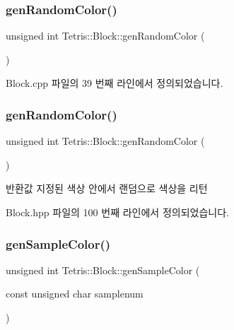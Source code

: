 \subsubsection{\texorpdfstring{gen\+Random\+Color()}{genRandomColor()}\hspace{0.1cm}{\footnotesize\ttfamily [1/2]}}
{\footnotesize\ttfamily unsigned int Tetris\+::\+Block\+::gen\+Random\+Color (\begin{DoxyParamCaption}{ }\end{DoxyParamCaption})}



Block.\+cpp 파일의 39 번째 라인에서 정의되었습니다.

\mbox{\label{class_tetris_1_1_block_a4bae85cab786853cb3ff76aa7fe72edc}} 
\subsubsection{\texorpdfstring{gen\+Random\+Color()}{genRandomColor()}\hspace{0.1cm}{\footnotesize\ttfamily [2/2]}}
{\footnotesize\ttfamily unsigned int Tetris\+::\+Block\+::gen\+Random\+Color (\begin{DoxyParamCaption}{ }\end{DoxyParamCaption})\hspace{0.3cm}{\ttfamily [inline]}}

\begin{DoxyReturn}{반환값}
지정된 색상 안에서 랜덤으로 색상을 리턴 
\end{DoxyReturn}


Block.\+hpp 파일의 100 번째 라인에서 정의되었습니다.

\mbox{\label{class_tetris_1_1_block_a9cac65704d2c788488ecf65d5b0467bd}} 
\subsubsection{\texorpdfstring{gen\+Sample\+Color()}{genSampleColor()}}
{\footnotesize\ttfamily unsigned int Tetris\+::\+Block\+::gen\+Sample\+Color (\begin{DoxyParamCaption}\item[{const unsigned char}]{samplenum }\end{DoxyParamCaption})}



